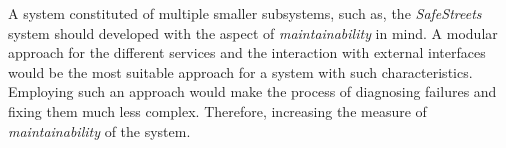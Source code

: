 A system constituted of multiple smaller subsystems, such as, the \emph{SafeStreets} system should developed with the aspect of \emph{maintainability} in mind. A modular approach for the different services and the interaction with external interfaces would be the most suitable approach for a system with such characteristics. Employing such an approach would make the process of diagnosing failures and fixing them much less complex. Therefore, increasing the measure of \emph{maintainability} of the system.